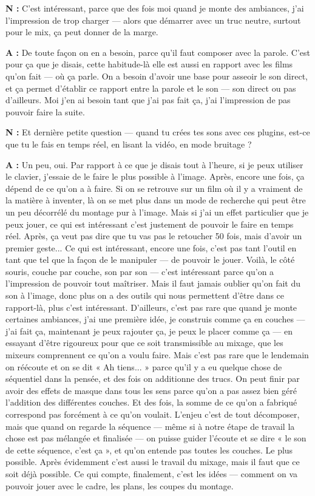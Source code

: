 ﻿\documentclass[12pt]{article}
\begin{document}
\textbf{N :} C'est intéressant, parce que des fois moi quand je monte des ambiances, j'ai l'impression de trop charger — alors que démarrer avec un truc neutre, surtout pour le mix, ça peut donner de la marge. 

\textbf{A :} De toute façon on en a besoin, parce qu'il faut composer avec la parole. C'est pour ça que je disais, cette habitude-là elle est aussi en rapport avec les films qu'on fait — où ça parle. On a besoin d'avoir une base pour asseoir le son direct, et ça permet d'établir ce rapport entre la parole et le son — son direct ou pas d'ailleurs. Moi j'en ai besoin tant que j'ai pas fait ça, j'ai l'impression de pas pouvoir faire la suite. 

\textbf{N :} Et dernière petite question — quand tu crées tes sons avec ces plugins, est-ce que tu le fais en temps réel, en lisant la vidéo, en mode bruitage ? 

\textbf{A :} Un peu, oui. Par rapport à ce que je disais tout à l'heure, si je peux utiliser le clavier, j'essaie de le faire le plus possible à l'image. Après, encore une fois, ça dépend de ce qu'on a à faire. Si on se retrouve sur un film où il y a vraiment de la matière à inventer, là on se met plus dans un mode de recherche qui peut être un peu décorrélé du montage pur à l'image. Mais si j'ai un effet particulier que je peux jouer, ce qui est intéressant c'est justement de pouvoir le faire en temps réel. Après, ça veut pas dire que tu vas pas le retoucher 50 fois, mais d'avoir un premier geste... Ce qui est intéressant, encore une fois, c'est pas tant l'outil en tant que tel que la façon de le manipuler — de pouvoir le jouer. Voilà, le côté souris, couche par couche, son par son — c'est intéressant parce qu'on a l'impression de pouvoir tout maîtriser. Mais il faut jamais oublier qu'on fait du son à l'image, donc plus on a des outils qui nous permettent d'être dans ce rapport-là, plus c'est intéressant. D'ailleurs, c'est pas rare que quand je monte certaines ambiances, j'ai une première idée, je construis comme ça en couches — j'ai fait ça, maintenant je peux rajouter ça, je peux le placer comme ça — en essayant d'être rigoureux pour que ce soit transmissible au mixage, que les mixeurs comprennent ce qu'on a voulu faire. Mais c'est pas rare que le lendemain on réécoute et on se dit « Ah tiens... » parce qu'il y a eu quelque chose de séquentiel dans la pensée, et des fois on additionne des trucs. On peut finir par avoir des effets de masque dans tous les sens parce qu'on a pas assez bien géré l'addition des différentes couches. Et des fois, la somme de ce qu'on a fabriqué correspond pas forcément à ce qu'on voulait. L'enjeu c'est de tout décomposer, mais que quand on regarde la séquence — même si à notre étape de travail la chose est pas mélangée et finalisée — on puisse guider l'écoute et se dire « le son de cette séquence, c'est ça », et qu'on entende pas toutes les couches. Le plus possible. Après évidemment c'est aussi le travail du mixage, mais il faut que ce soit déjà possible. Ce qui compte, finalement, c'est les idées — comment on va pouvoir jouer avec le cadre, les plans, les coupes du montage. 
\end{document}
